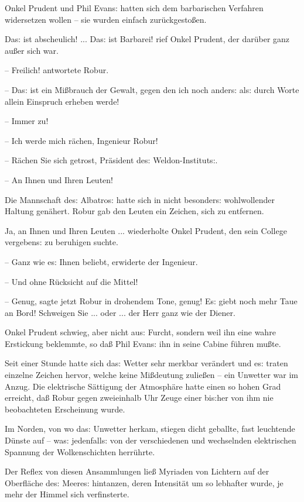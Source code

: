 \documentclass[oneside,12pt]{book}
\newcommand{\s}{s:}
\begin{document}
Onkel Prudent und Phil Evan{\s} hatten sich dem barbarischen
Verfahren widersetzen wollen -- sie wurden einfach
zur\"uckgesto{\ss}en.

{\glqq}Da{\s} ist abscheulich! ... Da{\s} ist Barbarei! rief Onkel
Prudent, der dar\"uber ganz au{\ss}er sich war.

-- Freilich! antwortete Robur.

-- Da{\s} ist ein Mi{\ss}brauch der Gewalt, gegen den ich noch
ander{\s} al{\s} durch Worte allein Einspruch erheben werde!

-- Immer zu!

-- Ich werde mich r\"achen, Ingenieur Robur!

-- R\"achen Sie sich getrost, Pr\"asident de{\s} Weldon-Institut{\s}.

-- An Ihnen und Ihren Leuten!{\grqq}

Die Mannschaft de{\s} {\glqq}Albatro{\s}{\grqq} hatte sich in nicht
besonder{\s} wohlwollender Haltung gen\"ahert. Robur gab den Leuten
ein Zeichen, sich zu entfernen.

{\glqq}Ja, an Ihnen und Ihren Leuten ... wiederholte Onkel Prudent,
den sein College vergeben{\s} zu beruhigen suchte.

-- Ganz wie e{\s} Ihnen beliebt, erwiderte der Ingenieur.

-- Und ohne R\"ucksicht auf die Mittel!

-- Genug, sagte jetzt Robur in drohendem Tone, genug! E{\s} giebt
noch mehr Taue an Bord! Schweigen Sie ... oder ... der Herr ganz wie
der Diener.{\grqq}

Onkel Prudent schwieg, aber nicht au{\s} Furcht, sondern weil ihn
eine wahre Erstickung beklemmte, so da{\ss} Phil Evan{\s} ihn in
seine Cabine f\"uhren mu{\ss}te.

Seit einer Stunde hatte sich da{\s} Wetter sehr merkbar ver\"andert
und e{\s} traten einzelne Zeichen hervor, welche keine Mi{\ss}deutung
zulie{\ss}en -- ein Unwetter war im Anzug. Die elektrische
S\"attigung der Atmosph\"are hatte einen so hohen Grad erreicht,
da{\ss} Robur gegen zweieinhalb Uhr Zeuge einer bi{\s}her von ihm nie
beobachteten Erscheinung wurde.

Im Norden, von wo da{\s} Unwetter herkam, stiegen dicht geballte,
fast leuchtende D\"unste auf -- wa{\s} jedenfall{\s} von der
verschiedenen und wechselnden elektrischen Spannung der
Wolkenschichten herr\"uhrte.

Der Reflex von diesen Ansammlungen lie{\ss} Myriaden von Lichtern auf
der Oberfl\"ache de{\s} Meere{\s} hintanzen, deren Intensit\"at um so
lebhafter wurde, je mehr der Himmel sich verfinsterte.
\end{document}
